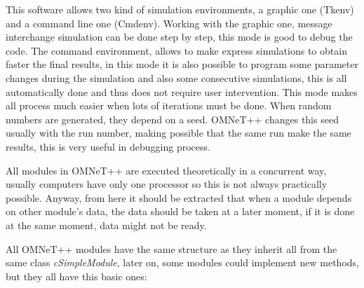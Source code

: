 This software allows two kind of simulation environments, a graphic one (Tkenv) and a command line one (Cmdenv). Working with the graphic one, 
message interchange simulation can be done step by step, this mode is good to debug the code. The command environment, allows to
make express simulations to obtain faster the final results, in this mode it is also possible to program some
parameter changes during the simulation and also some consecutive simulations, this is all automatically done and thus does not require user 
intervention. This mode makes all process much easier when lots of iterations must be done. When random numbers are generated, they depend on 
a seed. \ac{OMNeT++} changes this seed usually with the run number, making possible that the same run make the same results,
this is very useful in debugging process.

All modules in \ac{OMNeT++} are executed theoretically in a concurrent way, usually computers have only one processor so this is not always
practically possible. Anyway, from here it should be extracted that when a module depends on other module's data, the data should be taken at a 
later moment, if it is done at the same moment, data might not be ready.

All \ac{OMNeT++} modules have the same structure as they inherit all from the same class \textit{cSimpleModule}, later on, some modules could 
implement new methods, but they all have this basic ones:

